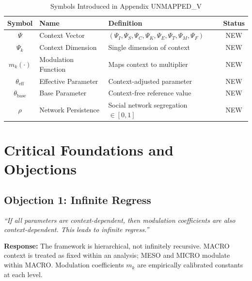 \begin{table}[htbp]
\centering
\caption{Symbols Introduced in Appendix UNMAPPED_V}
\label{tab:when-symbols}
\renewcommand{\arraystretch}{1.3}
\begin{tabular}{@{}clp{5cm}c@{}}
\toprule
\textbf{Symbol} & \textbf{Name} & \textbf{Definition} & \textbf{Status} \\
\midrule
$\Psi$ & Context Vector & $(\Psi_I, \Psi_S, \Psi_C, \Psi_K, \Psi_E, \Psi_T, \Psi_M, \Psi_F)$ & NEW \\
$\Psi_k$ & Context Dimension & Single dimension of context & NEW \\
$m_k(\cdot)$ & Modulation Function & Maps context to multiplier & NEW \\
$\theta_{\text{eff}}$ & Effective Parameter & Context-adjusted parameter & NEW \\
$\theta_{\text{base}}$ & Base Parameter & Context-free reference value & NEW \\
$\rho$ & Network Persistence & Social network segregation $\in [0,1]$ & NEW \\
\bottomrule
\end{tabular}
\end{table}


\section{Critical Foundations and Objections}
\label{sec:when-critical}

\subsection{Objection 1: Infinite Regress}

\begin{tcolorbox}[colback=red!5!white, colframe=red!50!black,
    title=Objection: Context Depends on Context]
\textit{``If all parameters are context-dependent, then modulation coefficients
are also context-dependent. This leads to infinite regress.''}
\end{tcolorbox}

\textbf{Response:}
The framework is hierarchical, not infinitely recursive. MACRO context is treated
as fixed within an analysis; MESO and MICRO modulate within MACRO. Modulation
coefficients $m_k$ are empirically calibrated constants at each level.

